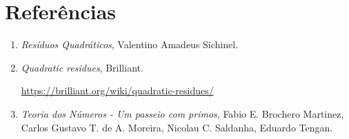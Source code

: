 \documentclass[10pt,a4paper]{article}
\begin{document}
	\newpage
	\section*{Referências}
	\begin{enumerate}
		\item \textit{Resíduos Quadráticos}, Valentino Amadeus Sichinel.
		\item \textit{Quadratic residues}, Brilliant. \par \url{https://brilliant.org/wiki/quadratic-residues/}
		\item \textit{Teoria dos Números - Um passeio com primos}, Fabio E. Brochero Martinez, Carlos Gustavo T. de A. Moreira, Nicolau C. Saldanha, Eduardo Tengan.
	\end{enumerate}
\end{document}
